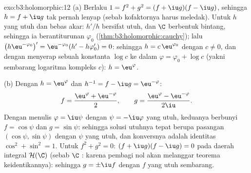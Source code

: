 \begin{solution}{exo:b3:holomorphic:12}
(a) Berlaku $1 = f^2 + g^2 = (f + \iu g)(f - \iu g)$, sehingga $h = f +
\iu g$ tak pernah lenyap (sebab kofaktornya harus meledak).
Untuk $h$ yang utuh dan bebas akar: $h'/h$ bersifat utuh, dan $\C$
berbentuk bintang, sehingga ia berantiturunan $\varphi_0$
(\cref{thm:b3:holomorphic:cauchy}); lalu
$\bigl(h\eu^{-\varphi_0}\bigr)' = \eu^{-\varphi_0}(h' -
h\varphi_0') = 0$: sehingga $h = c\,\eu^{\varphi_0}$ dengan $c \neq 0$,
dan dengan menyerap sebuah konstanta $\log c$ ke dalam $\varphi = \varphi_0
+ \log c$ (yakni sembarang logaritma kompleks $c$): $h =
\eu^{\varphi}$.

(b) Dengan $h = \eu^{\varphi}$ dan $h^{-1} = f - \iu g =
\eu^{-\varphi}$:
\[
f = \frac{\eu^{\varphi} + \eu^{-\varphi}}2,
\qquad
g = \frac{\eu^{\varphi} - \eu^{-\varphi}}{2\iu} .
\]
Dengan menulis $\varphi = \iu\psi$ dengan $\psi = -\iu\varphi$
yang utuh, keduanya berbunyi $f = \cos\psi$ dan $g = \sin\psi$: sehingga
solusi utuhnya tepat berupa pasangan $(\cos\psi,
\sin\psi)$ dengan $\psi$ yang utuh, dan konversnya adalah
identitas $\cos^2 + \sin^2 = 1$.
Untuk $f^2 + g^2 = 0$: $(f + \iu g)(f - \iu g) = 0$ pada
daerah integral $\mathcal H(\C)$ (sebab $\C$ : karena pembagi
nol akan melanggar teorema keidentikannya): sehingga $g = \pm\iu
f$ dengan $f$ yang utuh sembarang.
\end{solution}

